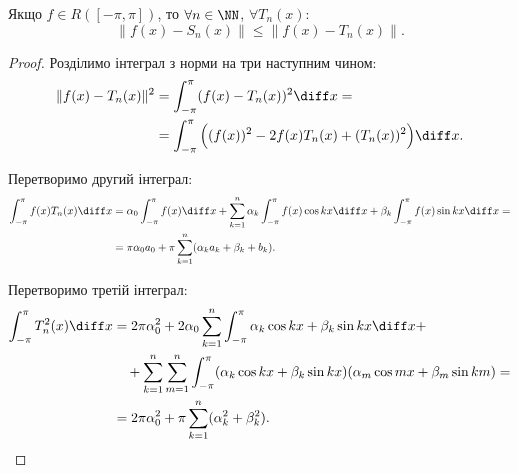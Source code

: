 \begin{theorem}
    Якщо $f \in R([-\pi,\pi])$, то $\forall n \in \NN$, $\forall T_n(x)$:
    \begin{equation}
        \|f(x) - S_n(x)\| \le \|f(x) - T_n(x)\|.
    \end{equation}
\end{theorem}
\begin{proof}
    Розділимо інтеграл з норми на три наступним чином:
    \begin{equation}
        \begin{aligned}
            \|f(x) - T_n(x)\|^2 
            &= \int_{-\pi}^\pi (f(x) - T_n(x))^2 \diff x = \\
            &= \int_{-\pi}^\pi \Big( (f(x))^2 - 2 f(x) T_n(x) + (T_n(x))^2 \Big) \diff x.
        \end{aligned}
    \end{equation}
    
    Перетворимо другий інтеграл:
    \begin{equation}
        \begin{aligned}
            \int_{-\pi}^\pi f(x) T_n(x) \diff x 
            &= \alpha_0 \int_{-\pi}^\pi f(x) \diff x + \sum_{k = 1}^n \alpha_k \int_{-\pi}^\pi f(x) \cos k x \diff x + \beta_k \int_{-\pi}^\pi f(x) \sin k x \diff x = \\
            &= \pi \alpha_0 a_0 + \pi \sum_{k = 1}^n (\alpha_k a_k + \beta_k + b_k).
        \end{aligned}
    \end{equation}
    
    Перетворимо третій інтеграл:
    \begin{equation}
        \begin{aligned}
            \int_{-\pi}^\pi T_n^2(x) \diff x 
            &= 2 \pi \alpha_0^2 + 2 \alpha_0 \sum_{k = 1}^n \int_{-\pi}^\pi \alpha_k \cos k x + \beta_k \sin k x \diff x + \\
            &\quad + \sum_{k = 1}^n \sum_{m = 1}^n \int_{-\pi}^\pi (\alpha_k \cos k x + \beta_k \sin k x) (\alpha_m \cos m x + \beta_m \sin k m) = \\
            &= 2 \pi \alpha_0^2 + \pi \sum_{k = 1}^n (\alpha_k^2 + \beta_k^2).
        \end{aligned}
    \end{equation}
    

\end{proof}
